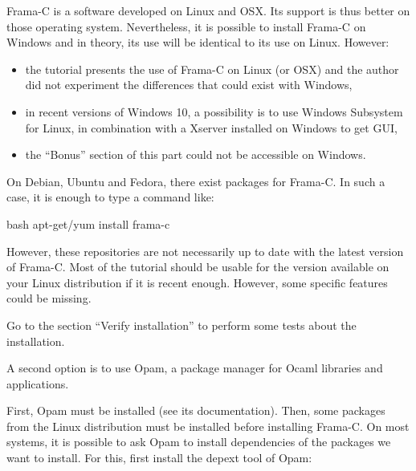 Frama-C is a software developed on Linux and OSX. Its support is thus better
on those operating system. Nevertheless, it is possible to install Frama-C
on Windows and in theory, its use will be identical to its use on Linux.
However:
\begin{Warning}
\begin{itemize}
  \item the tutorial presents the use of Frama-C on Linux (or OSX) and
    the author did not experiment the differences that could exist with Windows,
  \item in recent versions of Windows 10, a possibility is to use Windows
    Subsystem for Linux, in combination with a Xserver installed on Windows
    to get GUI,
  \item the ``Bonus'' section of this part could not be accessible on Windows.
  \end{itemize}
\end{Warning}






On Debian, Ubuntu and Fedora, there exist packages for Frama-C. In
such a case, it is enough to type a command like:



\begin{CodeBlock}{bash}
apt-get/yum install frama-c
\end{CodeBlock}



However, these repositories are not necessarily up to date with the latest
version of Frama-C. Most of the tutorial should be usable for the version
available on your Linux distribution if it is recent enough. However, some
specific features could be missing.



Go to the section ``Verify installation'' to perform some tests about
the installation.






A second option is to use Opam, a package manager for Ocaml libraries
and applications.



First, Opam must be installed (see its documentation). Then, some
packages from the Linux distribution must be installed before
installing Frama-C. On most systems, it is possible to ask Opam to install
dependencies of the packages we want to install. For this, first install
the depext tool of Opam:


